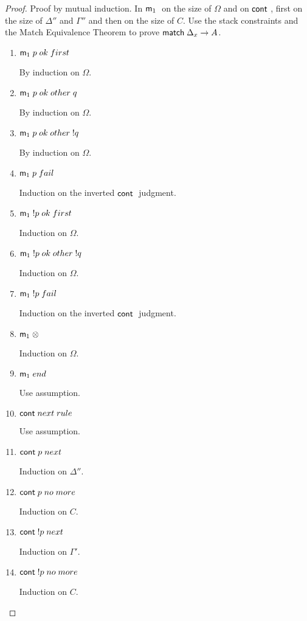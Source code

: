 \begin{proof}
   Proof by mutual induction. In $\mathsf{m}_1 \;$ on the size of $\Omega$ and on $\mathsf{cont} \;$, first on the size of $\Delta''$ and $\Gamma''$ and then on the size of $C$. Use the stack constraints and the Match Equivalence Theorem to prove $\mathsf{match} \; \Delta_x \rightarrow A$.

   \begin{enumerate}
      \item $\mathsf{m}_1 \; p \; ok \; first$
      
      By induction on $\Omega$.
      
      \item $\mathsf{m}_1 \; p \; ok \; other \; q$
      
      By induction on $\Omega$.
      
      \item $\mathsf{m}_1 \; p \; ok \; other \; {!} q$
      
      By induction on $\Omega$.
      
      \item $\mathsf{m}_1 \; p \; fail$
      
      Induction on the inverted $\mathsf{cont} \;$ judgment.
      
      \item $\mathsf{m}_1 \; {!} p \; ok \; first$
      
      Induction on $\Omega$.
      
      \item $\mathsf{m}_1 \; {!} p \; ok \; other \; {!} q$
      
      Induction on $\Omega$.
      
      \item $\mathsf{m}_1 \; {!} p \; fail$
      
      Induction on the inverted $\mathsf{cont} \;$ judgment.
      
      \item $\mathsf{m}_1 \; \otimes$
      
      Induction on $\Omega$.
      
      \item $\mathsf{m}_1 \; end$
      
      Use assumption.
      
      \item $\mathsf{cont} \; next \; rule$
      
      Use assumption.
      
      \item $\mathsf{cont} \; p \; next$
      
      Induction on $\Delta''$.
      
      \item $\mathsf{cont} \; p \; no \; more$
      
      Induction on $C$.
      
      \item $\mathsf{cont} \; {!} p \; next$
      
      Induction on $\Gamma'$.
      
      \item $\mathsf{cont} \; {!} p \; no \; more$
      
      Induction on $C$.
   \end{enumerate}
\end{proof}

